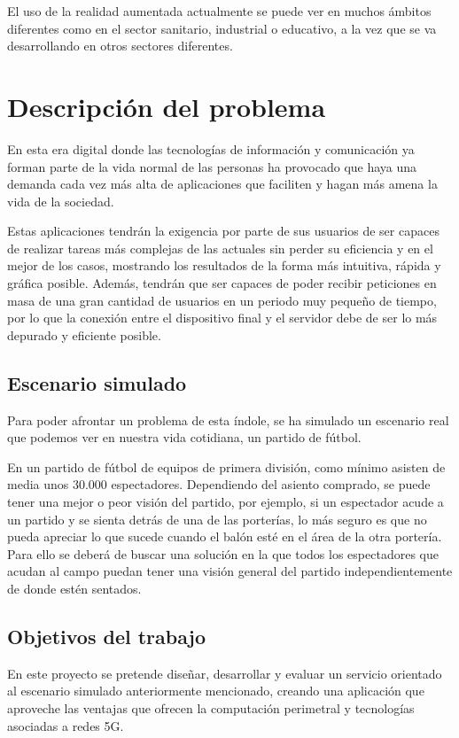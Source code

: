 El uso de la realidad aumentada actualmente se puede ver en muchos ámbitos diferentes como en el sector sanitario, industrial o educativo, a la vez que se va desarrollando en otros sectores diferentes.

\section{Descripción del problema}
En esta era digital donde las tecnologías de información y comunicación ya forman parte de la vida normal de las personas ha provocado que haya una demanda cada vez más alta de aplicaciones que faciliten y hagan más amena la vida de la sociedad.

Estas aplicaciones tendrán la exigencia por parte de sus usuarios de ser capaces de realizar tareas más complejas de las actuales sin perder su eficiencia y en el mejor de los casos, mostrando los resultados de la forma más intuitiva, rápida y gráfica posible. Además, tendrán que ser capaces de poder recibir peticiones en masa de una gran cantidad de usuarios en un periodo muy pequeño de tiempo, por lo que la conexión entre el dispositivo final y el servidor debe de ser lo más depurado y eficiente posible.

\subsection{Escenario simulado}
Para poder afrontar un problema de esta índole, se ha simulado un escenario real que podemos ver en nuestra vida cotidiana, un partido de fútbol.

En un partido de fútbol de equipos de primera división, como mínimo asisten de media unos 30.000 espectadores. Dependiendo del asiento comprado, se puede tener una mejor o peor visión del partido, por ejemplo, si un espectador acude a un partido y se sienta detrás de una de las porterías, lo más seguro es que no pueda apreciar lo que sucede cuando el balón esté en el área de la otra portería. Para ello se deberá de buscar una solución en la que todos los espectadores que acudan al campo puedan tener una visión general del partido independientemente de donde estén sentados.

\subsection{Objetivos del trabajo}
En este proyecto se pretende diseñar, desarrollar y evaluar un servicio orientado al escenario simulado anteriormente mencionado, creando una aplicación que aproveche las ventajas que ofrecen la computación perimetral y tecnologías asociadas a redes 5G. 

